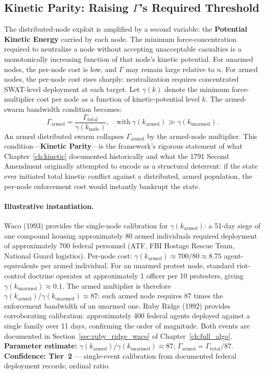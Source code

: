 \subsection{Kinetic Parity: Raising $\Gamma$'s Required Threshold}

The distributed-node exploit is amplified by a second variable: the \textbf{Potential Kinetic Energy} carried by each node. The minimum force-concentration required to neutralize a node without accepting unacceptable casualties is a monotonically increasing function of that node's kinetic potential. For unarmed nodes, the per-node cost is low, and $\Gamma$ may remain large relative to $n$. For armed nodes, the per-node cost rises sharply: neutralization requires concentrated SWAT-level deployment at each target. Let $\gamma(k)$ denote the minimum force-multiplier cost per node as a function of kinetic-potential level $k$. The armed-swarm bandwidth condition becomes:
\begin{equation}\label{eq:14.8-armed-swarm-bandwidth}
\Gamma_{\text{armed}} = \frac{\Gamma_{\text{total}}}{\gamma(k_{\text{node}})}, \quad \text{with} \ \gamma(k_{\text{armed}}) \gg \gamma(k_{\text{unarmed}}).
\end{equation}
An armed distributed swarm collapses $\Gamma_{\text{armed}}$ by the armed-node multiplier. This condition---\textbf{Kinetic Parity}---is the framework's rigorous statement of what Chapter~\ref{ch:kinetic} documented historically and what the 1791 Second Amendment originally attempted to encode as a structural deterrent: if the state ever initiated total kinetic conflict against a distributed, armed population, the per-node enforcement cost would instantly bankrupt the state.

\paragraph{Illustrative instantiation.}
Waco (1993) provides the single-node calibration for $\gamma(k_{\text{armed}})$: a 51-day siege of one compound housing approximately 80 armed individuals required deployment of approximately 700 federal personnel (ATF, FBI Hostage Rescue Team, National Guard logistics). Per-node cost: $\gamma(k_{\text{armed}}) \approx 700/80 \approx 8.75$ agent-equivalents per armed individual. For an unarmed protest node, standard riot-control doctrine operates at approximately 1 officer per 10 protesters, giving $\gamma(k_{\text{unarmed}}) \approx 0.1$. The armed multiplier is therefore $\gamma(k_{\text{armed}}) / \gamma(k_{\text{unarmed}}) \approx 87$: each armed node requires 87 times the enforcement bandwidth of an unarmed one. Ruby Ridge (1992) provides corroborating calibration: approximately 400 federal agents deployed against a single family over 11 days, confirming the order of magnitude. Both events are documented in Section~\ref{sec:ruby_ridge_waco} of Chapter~\ref{ch:full_algo}. \textbf{Parameter estimate:} $\gamma(k_{\text{armed}}) / \gamma(k_{\text{unarmed}}) \approx 87$; $\Gamma_{\text{armed}} = \Gamma_{\text{total}} / 87$. \textbf{Confidence: Tier~2} --- single-event calibration from documented federal deployment records; ordinal ratio.

